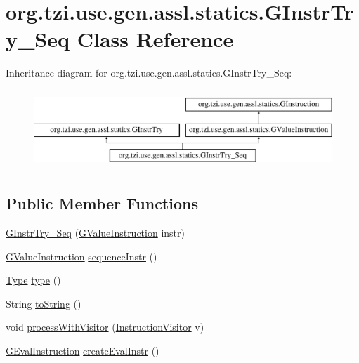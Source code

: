 \hypertarget{classorg_1_1tzi_1_1use_1_1gen_1_1assl_1_1statics_1_1_g_instr_try___seq}{\section{org.\-tzi.\-use.\-gen.\-assl.\-statics.\-G\-Instr\-Try\-\_\-\-Seq Class Reference}
\label{classorg_1_1tzi_1_1use_1_1gen_1_1assl_1_1statics_1_1_g_instr_try___seq}
}
Inheritance diagram for org.\-tzi.\-use.\-gen.\-assl.\-statics.\-G\-Instr\-Try\-\_\-\-Seq\-:\begin{figure}[H]
\begin{center}
\leavevmode
\includegraphics[height=3.000000cm]{classorg_1_1tzi_1_1use_1_1gen_1_1assl_1_1statics_1_1_g_instr_try___seq}
\end{center}
\end{figure}
\subsection*{Public Member Functions}
\begin{DoxyCompactItemize}
\item 
\hyperlink{classorg_1_1tzi_1_1use_1_1gen_1_1assl_1_1statics_1_1_g_instr_try___seq_acd1d2a2812575379890a0c891d14c81b}{G\-Instr\-Try\-\_\-\-Seq} (\hyperlink{interfaceorg_1_1tzi_1_1use_1_1gen_1_1assl_1_1statics_1_1_g_value_instruction}{G\-Value\-Instruction} instr)
\item 
\hyperlink{interfaceorg_1_1tzi_1_1use_1_1gen_1_1assl_1_1statics_1_1_g_value_instruction}{G\-Value\-Instruction} \hyperlink{classorg_1_1tzi_1_1use_1_1gen_1_1assl_1_1statics_1_1_g_instr_try___seq_a05c6cc156ebfed707582e8e34dd1b74b}{sequence\-Instr} ()
\item 
\hyperlink{interfaceorg_1_1tzi_1_1use_1_1uml_1_1ocl_1_1type_1_1_type}{Type} \hyperlink{classorg_1_1tzi_1_1use_1_1gen_1_1assl_1_1statics_1_1_g_instr_try___seq_a74cde30ff57b4f33aae4b33068a6e82d}{type} ()
\item 
String \hyperlink{classorg_1_1tzi_1_1use_1_1gen_1_1assl_1_1statics_1_1_g_instr_try___seq_aa9c0209cb1b9b2067ba435c4f30ff756}{to\-String} ()
\item 
void \hyperlink{classorg_1_1tzi_1_1use_1_1gen_1_1assl_1_1statics_1_1_g_instr_try___seq_ac86a72913068611c594803d8d3d49150}{process\-With\-Visitor} (\hyperlink{interfaceorg_1_1tzi_1_1use_1_1gen_1_1assl_1_1statics_1_1_instruction_visitor}{Instruction\-Visitor} v)
\item 
\hyperlink{classorg_1_1tzi_1_1use_1_1gen_1_1assl_1_1dynamics_1_1_g_eval_instruction}{G\-Eval\-Instruction} \hyperlink{classorg_1_1tzi_1_1use_1_1gen_1_1assl_1_1statics_1_1_g_instr_try___seq_a229dc15785557fdd5f4ab11977244c27}{create\-Eval\-Instr} ()
\end{DoxyCompactItemize}
